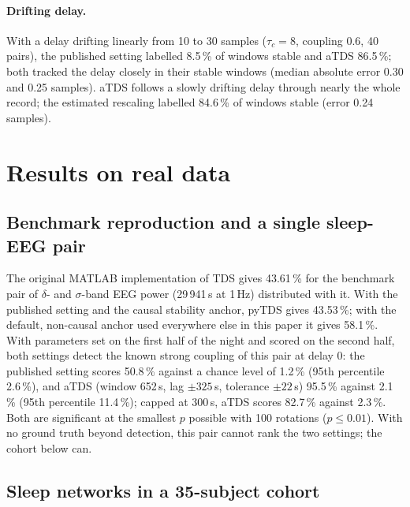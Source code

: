 \documentclass[11pt,a4paper]{article}
\begin{document}
\paragraph{Drifting delay.} With a delay drifting linearly from 10 to 30 samples ($\tau_c = 8$, coupling 0.6, 40 pairs), the published setting labelled 8.5\,\% of windows stable and aTDS 86.5\,\%; both tracked the delay closely in their stable windows (median absolute error 0.30 and 0.25 samples). aTDS follows a slowly drifting delay through nearly the whole record; the estimated rescaling labelled 84.6\,\% of windows stable (error 0.24 samples).

\section{Results on real data}
\label{sec:realdata}
\subsection{Benchmark reproduction and a single sleep-EEG pair}
\label{sec:res-benchmark}
The original MATLAB implementation of TDS gives 43.61\,\% for the benchmark pair of $\delta$- and $\sigma$-band EEG power (29\,941\,s at 1\,Hz) distributed with it. With the published setting and the causal stability anchor, pyTDS gives 43.53\,\%; with the default, non-causal anchor used everywhere else in this paper it gives 58.1\,\%. With parameters set on the first half of the night and scored on the second half, both settings detect the known strong coupling of this pair at delay 0: the published setting scores 50.8\,\% against a chance level of 1.2\,\% (95th percentile 2.6\,\%), and aTDS (window 652\,s, lag $\pm325$\,s, tolerance $\pm22$\,s) 95.5\,\% against 2.1\,\% (95th percentile 11.4\,\%); capped at 300\,s, aTDS scores 82.7\,\% against 2.3\,\%. Both are significant at the smallest $p$ possible with 100 rotations ($p \le 0.01$). With no ground truth beyond detection, this pair cannot rank the two settings; the cohort below can.

\subsection{Sleep networks in a 35-subject cohort}
\label{sec:res-cohort}
\end{document}
